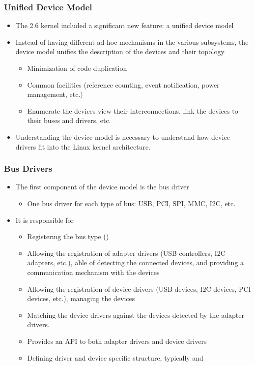 \begin{frame}
  \frametitle{Unified Device Model}
  \begin{itemize}
  \item The 2.6 kernel included a significant new feature: a unified
    device model
  \item Instead of having different ad-hoc mechanisms in the various
    subsystems, the device model unifies the description of the
    devices and their topology
    \begin{itemize}
    \item Minimization of code duplication
    \item Common facilities (reference counting, event notification,
      power management, etc.)
    \item Enumerate the devices view their interconnections, link the
      devices to their buses and drivers, etc.
    \end{itemize}
  \item Understanding the device model is necessary to understand how
    device drivers fit into the Linux kernel architecture.
  \end{itemize}
\end{frame}

\begin{frame}
  \frametitle{Bus Drivers}
  \begin{itemize}
  \item The first component of the device model is the bus driver
    \begin{itemize}
    \item One bus driver for each type of bus: USB, PCI, SPI, MMC,
      I2C, etc.
    \end{itemize}
  \item It is responsible for
    \begin{itemize}
    \item Registering the bus type ()
    \item Allowing the registration of adapter drivers (USB
      controllers, I2C adapters, etc.), able of detecting the
      connected devices, and providing a communication mechanism with
      the devices
    \item Allowing the registration of device drivers (USB devices,
      I2C devices, PCI devices, etc.), managing the devices
    \item Matching the device drivers against the devices detected by
      the adapter drivers.
    \item Provides an API to both adapter drivers and device drivers
    \item Defining driver and device specific structure, typically
       and 
    \end{itemize}
  \end{itemize}
\end{frame}

